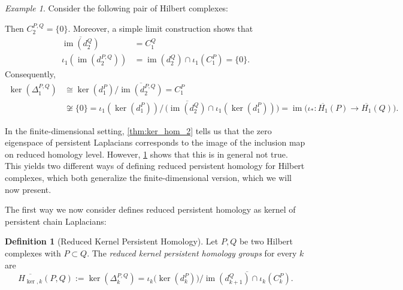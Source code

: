 \documentclass[11pt]{article}
\theoremstyle{definition}
\newtheorem{definition}[theorem]{Definition}
\theoremstyle{remark}
\newtheorem{example}[theorem]{Example}
\DeclareMathOperator{\im}{im}
\newcommand{\R}{\mathbb{R}}
\begin{document}
\begin{example} \label{ex:kernotPH}
    Consider the following pair of Hilbert complexes:
    \begin{figure}[H]
    \centering
\end{figure}
Then $C^{P,Q}_2=\{0\}$. Moreover, a simple limit construction shows that
\begin{align*}
    \overline{\im(d_2^Q)}&=C_1^Q\\
    \iota_1(\im(d_2^{P,Q}))&=\im(d_2^Q)\cap \iota_1 (C_1^P)=\{0\}.
\end{align*}
Consequently,
\begin{align*}
    \ker(\Delta_1^{P,Q})&\cong \ker(d_1^P) \big/ \overline{\im(d_2^{P,Q})} = C_1^P \\
    &\not \cong \{0\}=\iota_1(\ker(d_1^P)) \big/ \, \big( \overline{\im(d_{2}^Q)} \cap \iota_1(\ker\left(d_1^P\right))\big)=\im\big(\iota_*: \overline{H_1}(P) \rightarrow \overline {H_1}(Q)\big).
\end{align*}
\end{example}

In the finite-dimensional setting, \cref{thm:ker_hom_2} tells us that the zero eigenspace of persistent Laplacians corresponds to the image of the inclusion map on reduced homology level. However, \cref{ex:kernotPH} shows that this is in general not true. This yields two different ways of defining reduced persistent homology for Hilbert complexes, which both generalize the finite-dimensional version, which we will now present. 

The first way we now consider defines reduced persistent homology as kernel of persistent chain Laplacians:

\begin{definition}[Reduced Kernel Persistent Homology]
    Let $P,Q$ be two Hilbert complexes with $P \subset Q$. The \emph{reduced kernel persistent homology groups} for every $k$ are
    $$
    \overline{H_{\ker,k}}(P,Q) := \ker(\Delta_k^{P,Q}) = \iota_k\big(\ker(d_k^P)\big) \big/ \overline{\im(d_{k+1}^Q) \cap \iota_k (C_k^P)}.
    $$
\end{definition}
\end{document}
